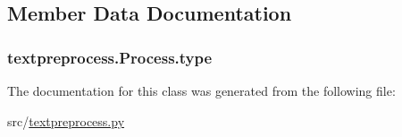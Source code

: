 \subsection{Member Data Documentation}
\subsubsection[{\texorpdfstring{type}{type}}]{\setlength{\rightskip}{0pt plus 5cm}textpreprocess.\+Process.\+type}\hypertarget{classtextpreprocess_1_1_process_a79fe786561553b771bf7db0759d6d311}{}\label{classtextpreprocess_1_1_process_a79fe786561553b771bf7db0759d6d311}


The documentation for this class was generated from the following file\+:\begin{DoxyCompactItemize}
\item 
src/\hyperlink{textpreprocess_8py}{textpreprocess.\+py}\end{DoxyCompactItemize}
